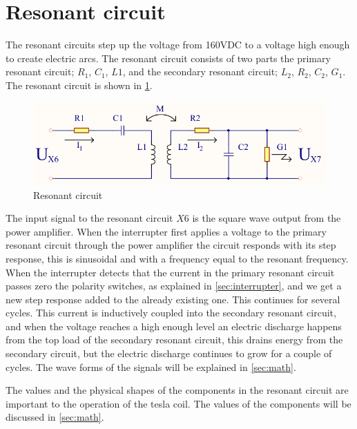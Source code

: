
\newpage
\section{Resonant circuit}
\label{sec:resonant}

The resonant circuits step up the voltage from 160VDC to a voltage high enough to create electric arcs. The resonant circuit consists of two parts the primary resonant circuit; $R_1$, $C_1$, $L1$, and the secondary resonant circuit; $L_2$, $R_2$, $C_2$, $G_1$. The resonant circuit is shown in \cref{fig:spolerigg1}.

\begin{figure}[H]
    \centering
    \includegraphics[width=\textwidth]{Skjema/Spolerigg1_r.pdf}
    \caption{Resonant circuit}
    \label{fig:spolerigg1}
\end{figure}

The input signal to the resonant circuit $X6$ is the square wave output from the power amplifier. When the interrupter first applies a voltage to the primary resonant circuit through the power amplifier the circuit responds with its step response, this is sinusoidal and with a frequency equal to the resonant frequency. When the interrupter detects that the current in the primary resonant circuit passes zero the polarity switches, as explained in \cref{sec:interrupter}, and we get a new step response added to the already existing one. This continues for several cycles. This current is inductively coupled into the secondary resonant circuit, and when the voltage reaches a high enough level an electric discharge happens from the top load of the secondary resonant circuit, this drains energy from the secondary circuit, but the electric discharge continues to grow for a couple of cycles. The wave forms of the signals will be explained in \cref{sec:math}.

The values and the physical shapes of the components in the resonant circuit are important to the operation of the tesla coil. The values of the components will be discussed in \cref{sec:math}.

